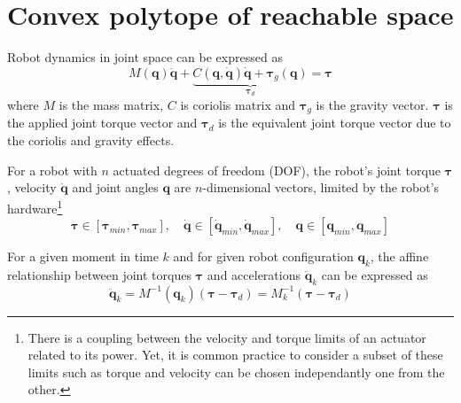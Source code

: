 



\section{Convex polytope of reachable space}
\label{ch:polytope}


Robot dynamics in joint space can be expressed as
\begin{equation}
    M(\bm{q})\ddot{\bm{q}} +\underbrace{ C(\bm{q},\dot{\bm{q}})\dot{\bm{q}} + \bm{\tau}_g(\bm{q}) }_{\bm{\tau}_d}= \bm{\tau}
    \label{eq:robot_model}
\end{equation}
where $M$ is the mass matrix, $C$ is coriolis matrix and $\bm{\tau}_g$ is the gravity vector. $\bm{\tau}$ is the applied joint torque vector and $\bm{\tau}_d$ is the equivalent joint torque vector due to the coriolis and gravity effects.

For a robot with $n$ actuated degrees of freedom (DOF), the robot's joint torque $\bm{\tau}$, velocity $\dot{\bm{q}}$ and joint angles $\bm{q}$ are $n$-dimensional vectors, limited by the robot's hardware\footnote{There is a coupling between the velocity and torque limits of an actuator related to its power. Yet, it is common practice to consider a subset of these limits such as torque and velocity can be chosen independantly one from the other.}
\begin{equation}
 \bm{\tau}\in\left[\bm{\tau}_{min},\bm{\tau}_{max}\right], \quad 
 \dot{\bm{q}}\in\left[\dot{\bm{q}}_{min},\dot{\bm{q}}_{max}\right], \quad \bm{q}\in\left[\bm{q}_{min},\bm{q}_{max}\right]
 \label{eq:limits}
\end{equation}


For a given moment in time $k$ and for given robot configuration $\bm{q}_k$, the affine relationship between joint torques $\bm{\tau}$ and accelerations $\ddot{\bm{q}}_{k}$ can be expressed as
\begin{equation}
    \ddot{\bm{q}}_{k} = M^{-1}(\bm{q}_k)(\bm{\tau} - \bm{\tau}_d) = M_k^{-1}(\bm{\tau} - \bm{\tau}_d)
\end{equation}

